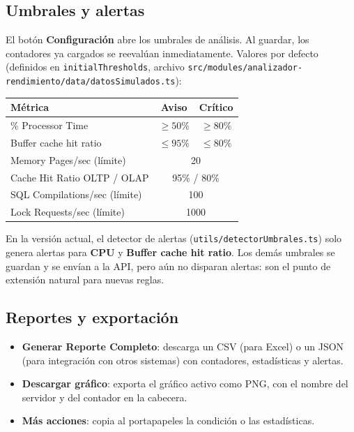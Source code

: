 \documentclass[11pt,a4paper]{article}
\newcommand{\ruta}[1]{\texttt{#1}}
\begin{document}
\subsection{Umbrales y alertas}
El botón \textbf{Configuración} abre los umbrales de análisis. Al guardar, los
contadores ya cargados se reevalúan inmediatamente. Valores por defecto (definidos en
\texttt{initialThresholds}, archivo \ruta{src/modules/analizador-rendimiento/data/datosSimulados.ts}):

\begin{center}
\begin{tabular}{lcc}
\toprule
\textbf{Métrica} & \textbf{Aviso} & \textbf{Crítico} \\
\midrule
\% Processor Time            & $\geq 50\%$ & $\geq 80\%$ \\
Buffer cache hit ratio       & $\leq 95\%$ & $\leq 80\%$ \\
Memory Pages/sec (límite)    & \multicolumn{2}{c}{20} \\
Cache Hit Ratio OLTP / OLAP  & \multicolumn{2}{c}{95\% / 80\%} \\
SQL Compilations/sec (límite)& \multicolumn{2}{c}{100} \\
Lock Requests/sec (límite)   & \multicolumn{2}{c}{1000} \\
\bottomrule
\end{tabular}
\end{center}

\begin{nota}
En la versión actual, el detector de alertas
(\ruta{utils/detectorUmbrales.ts}) solo genera alertas para \textbf{CPU} y
\textbf{Buffer cache hit ratio}. Los demás umbrales se guardan y se envían a la API,
pero aún no disparan alertas: son el punto de extensión natural para nuevas reglas.
\end{nota}

\subsection{Reportes y exportación}
\begin{itemize}[leftmargin=*]
  \item \textbf{Generar Reporte Completo}: descarga un CSV (para Excel) o un JSON (para
        integración con otros sistemas) con contadores, estadísticas y alertas.
  \item \textbf{Descargar gráfico}: exporta el gráfico activo como PNG, con el nombre
        del servidor y del contador en la cabecera.
  \item \textbf{Más acciones}: copia al portapapeles la condición o las estadísticas.
\end{itemize}
\end{document}
